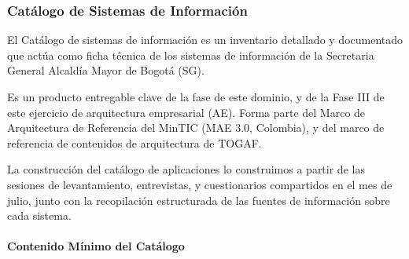 \documentclass[
	a4paper, %
	12pt, %
]{include/CSSullivanBusinessReport}
\begin{document}
\subsubsection{Catálogo de Sistemas de
Información}\label{sec:catuxe1logo-de-sistemas-de-informaciuxf3n}

El Catálogo de sistemas de información es un inventario detallado y
documentado que actúa como ficha técnica de los sistemas de información
de la Secretaria General Alcaldía Mayor de Bogotá (SG).

Es un producto entregable clave de la fase de este dominio, y de la Fase
III de este ejercicio de arquitectura empresarial (AE). Forma parte del
Marco de Arquitectura de Referencia del MinTIC (MAE 3.0, Colombia), y
del marco de referencia de contenidos de arquitectura de TOGAF.

La construcción del catálogo de aplicaciones lo construimos a partir de
las sesiones de levantamiento, entrevistas, y cuestionarios compartidos
en el mes de julio, junto con la recopilación estructurada de las
fuentes de información sobre cada sistema.

\paragraph{Contenido Mínimo del
Catálogo}\label{sec:contenido-muxednimo-del-catuxe1logo}
\end{document}

